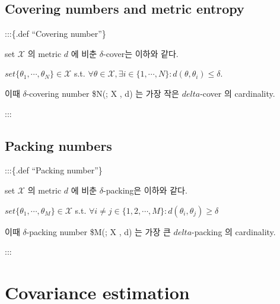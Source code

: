 \documentclass[
]{book}
\begin{document}
{{{\hypertarget{covering-numbers-and-metric-entropy}{%
\subsection{Covering numbers and metric entropy}\label{covering-numbers-and-metric-entropy}}

:::\{.def ``Covering number''\}

set \(\mathcal X\) 의 metric \(d\) 에 비춘 \(\delta\)-cover는 이하와 같다.

\(set \{\theta_1, \cdots, \theta_N\} \in \mathcal X\) s.t. \(\forall \theta \in \mathcal X, \exists i \in \{1 , \cdots, N \} : d(\theta, \theta_i) \le \delta\).

이때 \(\delta\)-covering number \$N(\delta; \mathcal X , d) 는 가장 작은 \(delta\)-cover 의 cardinality.

:::

\hypertarget{packing-numbers}{%
\subsection{Packing numbers}\label{packing-numbers}}

:::\{.def ``Packing number''\}

set \(\mathcal X\) 의 metric \(d\) 에 비춘 \(\delta\)-packing은 이하와 같다.

\(set \{\theta_1, \cdots, \theta_M\} \in \mathcal X\) s.t. \(\forall i \not = j \in \{1, 2, \cdots, M\}: d(\theta_i, \theta_j) \ge \delta\)

이때 \(\delta\)-packing number \$M(\delta; \mathcal X , d) 는 가장 큰 \(delta\)-packing 의 cardinality.

:::

\hypertarget{section-7}{%
\subsection{}\label{section-7}}

\hypertarget{section-8}{%
\subsection{}\label{section-8}}

\hypertarget{section-9}{%
\subsection{}\label{section-9}}

\hypertarget{covariance-estimation}{%
\section{Covariance estimation}\label{covariance-estimation}}

}}}
\end{document}
